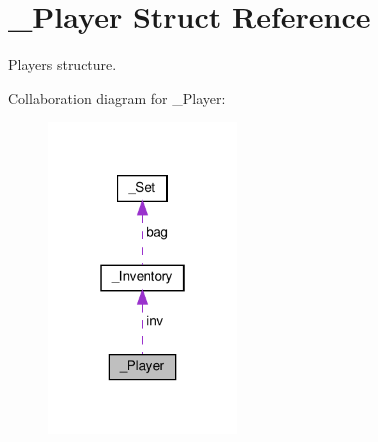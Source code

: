 \hypertarget{struct__Player}{}\section{\+\_\+\+Player Struct Reference}
\label{struct__Player}


Player\textquotesingle{}s structure.  




Collaboration diagram for \+\_\+\+Player\+:\nopagebreak
\begin{figure}[H]
\begin{center}
\leavevmode
\includegraphics[width=142pt]{struct__Player__coll__graph}
\end{center}
\end{figure}
